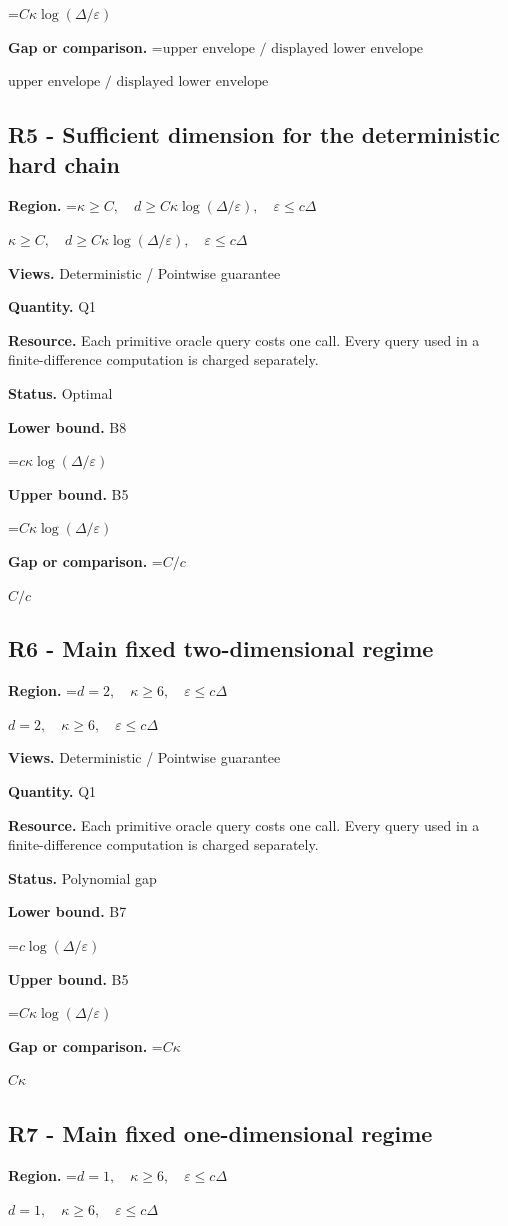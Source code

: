 \documentclass[10pt,a4paper]{article}
\newcommand{\AtlasMath}[1]{\par\begingroup\centering\setbox0=\hbox{$\displaystyle #1$}\ifdim\wd0>1.4\linewidth\typeout{ATLAS WIDE FORMULA: \the\wd0}\fi\ifdim\wd0>\linewidth\resizebox{\linewidth}{!}{\box0}\else\box0\fi\par\endgroup}
\newcommand{\AtlasInlineMath}[1]{\begingroup\setbox0=\hbox{$#1$}\ifdim\wd0>.4\linewidth\endgroup\AtlasMath{#1}\else\endgroup$#1$\fi}
\begin{document}
\AtlasMath{C\kappa\log(\Delta/\varepsilon)}
\textbf{Gap or comparison.} \AtlasInlineMath{\text{upper envelope / displayed lower envelope}}

\subsection{R5 - Sufficient dimension for the deterministic hard chain}
\textbf{Region.} \AtlasInlineMath{\kappa\ge C,\quad d\ge C\kappa\log(\Delta/\varepsilon),\quad\varepsilon\le c\Delta}

\textbf{Views.} Deterministic / Pointwise guarantee

\textbf{Quantity.} Q1

\textbf{Resource.} Each primitive oracle query costs one call. Every query used in a finite-difference computation is charged separately.

\textbf{Status.} Optimal

\textbf{Lower bound.} B8

\AtlasMath{c\kappa\log(\Delta/\varepsilon)}
\textbf{Upper bound.} B5

\AtlasMath{C\kappa\log(\Delta/\varepsilon)}
\textbf{Gap or comparison.} \AtlasInlineMath{C/c}

\subsection{R6 - Main fixed two-dimensional regime}
\textbf{Region.} \AtlasInlineMath{d=2,\quad\kappa\ge6,\quad\varepsilon\le c\Delta}

\textbf{Views.} Deterministic / Pointwise guarantee

\textbf{Quantity.} Q1

\textbf{Resource.} Each primitive oracle query costs one call. Every query used in a finite-difference computation is charged separately.

\textbf{Status.} Polynomial gap

\textbf{Lower bound.} B7

\AtlasMath{c\log(\Delta/\varepsilon)}
\textbf{Upper bound.} B5

\AtlasMath{C\kappa\log(\Delta/\varepsilon)}
\textbf{Gap or comparison.} \AtlasInlineMath{C\kappa}

\subsection{R7 - Main fixed one-dimensional regime}
\textbf{Region.} \AtlasInlineMath{d=1,\quad\kappa\ge6,\quad\varepsilon\le c\Delta}
\end{document}
